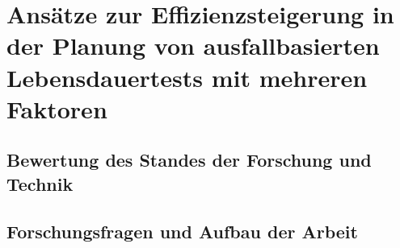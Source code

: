
\chapter{Ansätze zur Effizienzsteigerung in der Planung von ausfallbasierten Lebensdauertests mit mehreren Faktoren} \label{chap:ansatz}

\section{Bewertung des Standes der Forschung und Technik}

\section{Forschungsfragen und Aufbau der Arbeit}